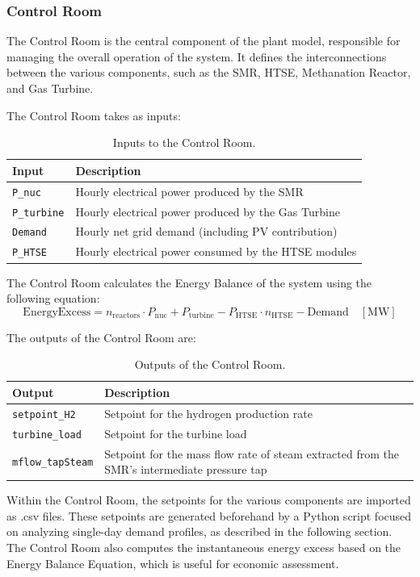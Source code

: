 \subsubsection{Control Room}
\label{subsubsec:control-room}
The Control Room is the central component of the plant model, responsible for managing the overall operation of the system.
It defines the interconnections between the various components, such as the SMR, HTSE, Methanation Reactor, and Gas Turbine.

The Control Room takes as inputs:

\begin{table}[H]
\centering
\begin{tabular}{ll}
\toprule
\textbf{Input} & \textbf{Description} \\
\midrule
\verb|P_nuc| & Hourly electrical power produced by the SMR \\
\verb|P_turbine| & Hourly electrical power produced by the Gas Turbine \\
\verb|Demand| & Hourly net grid demand (including PV contribution) \\
\verb|P_HTSE| & Hourly electrical power consumed by the HTSE modules \\
\bottomrule
\end{tabular}
\caption{Inputs to the Control Room.}
\end{table}

The Control Room calculates the Energy Balance of the system using the following equation:
\begin{equation}
  \mathrm{EnergyExcess} = n_{\mathrm{reactors}} \cdot P_{\mathrm{nuc}} + P_{\mathrm{turbine}} - P_{\mathrm{HTSE}} \cdot n_{\mathrm{HTSE}} - \mathrm{Demand} \quad [\mathrm{MW}]
\end{equation}

The outputs of the Control Room are:
\begin{table}[H]
\centering
\begin{tabular}{ll}
\toprule
\textbf{Output} & \textbf{Description} \\
\midrule
\verb|setpoint_H2| & Setpoint for the hydrogen production rate \\
\verb|turbine_load| & Setpoint for the turbine load \\
\verb|mflow_tapSteam| & Setpoint for the mass flow rate of steam extracted from the SMR's intermediate pressure tap \\
\bottomrule
\end{tabular}
\caption{Outputs of the Control Room.}
\end{table}

Within the Control Room, the setpoints for the various components are imported as .csv files. These setpoints are generated beforehand by a Python script focused on analyzing single-day demand profiles, as described in the following section. The Control Room also computes the instantaneous energy excess based on the Energy Balance Equation, which is useful for economic assessment.